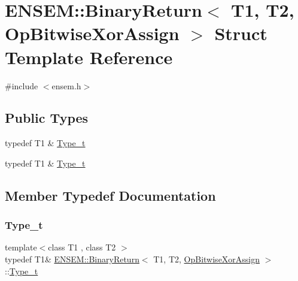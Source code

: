 \hypertarget{structENSEM_1_1BinaryReturn_3_01T1_00_01T2_00_01OpBitwiseXorAssign_01_4}{}\section{E\+N\+S\+EM\+:\+:Binary\+Return$<$ T1, T2, Op\+Bitwise\+Xor\+Assign $>$ Struct Template Reference}
\label{structENSEM_1_1BinaryReturn_3_01T1_00_01T2_00_01OpBitwiseXorAssign_01_4}


{\ttfamily \#include $<$ensem.\+h$>$}

\subsection*{Public Types}
\begin{DoxyCompactItemize}
\item 
typedef T1 \& \mbox{\hyperlink{structENSEM_1_1BinaryReturn_3_01T1_00_01T2_00_01OpBitwiseXorAssign_01_4_afa71b93b033427a13f9ffcbcb4ffb6dc}{Type\+\_\+t}}
\item 
typedef T1 \& \mbox{\hyperlink{structENSEM_1_1BinaryReturn_3_01T1_00_01T2_00_01OpBitwiseXorAssign_01_4_afa71b93b033427a13f9ffcbcb4ffb6dc}{Type\+\_\+t}}
\end{DoxyCompactItemize}


\subsection{Member Typedef Documentation}
\mbox{\label{structENSEM_1_1BinaryReturn_3_01T1_00_01T2_00_01OpBitwiseXorAssign_01_4_afa71b93b033427a13f9ffcbcb4ffb6dc}} 
\subsubsection{\texorpdfstring{Type\_t}{Type\_t}\hspace{0.1cm}{\footnotesize\ttfamily [1/2]}}
{\footnotesize\ttfamily template$<$class T1 , class T2 $>$ \\
typedef T1\& \mbox{\hyperlink{structENSEM_1_1BinaryReturn}{E\+N\+S\+E\+M\+::\+Binary\+Return}}$<$ T1, T2, \mbox{\hyperlink{structENSEM_1_1OpBitwiseXorAssign}{Op\+Bitwise\+Xor\+Assign}} $>$\+::\mbox{\hyperlink{structENSEM_1_1BinaryReturn_3_01T1_00_01T2_00_01OpBitwiseXorAssign_01_4_afa71b93b033427a13f9ffcbcb4ffb6dc}{Type\+\_\+t}}}

